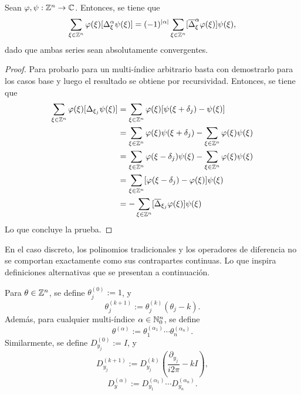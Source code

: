 \begin{proposition}
	Sean $\varphi,\psi:\mathbb{Z}^n\to\mathbb{C}$. Entonces, se tiene que 
	\begin{equation*}
		\sum_{\xi\in\mathbb{Z}^n}\varphi(\xi) [\Delta^\alpha_\xi\psi(\xi)] = (-1)^{|\alpha|}\sum_{\xi\in\mathbb{Z}^n} [\overline{\Delta}^\alpha_\xi\varphi(\xi)]\psi(\xi),
	\end{equation*}
	dado que ambas series sean absolutamente convergentes.
\end{proposition}
\begin{proof}
	Para probarlo para un multi-índice arbitrario basta con demostrarlo para los casos base y luego el resultado se obtiene por recursividad. Entonces, se tiene que 
	\begin{align*}
		\sum_{\xi\in\mathbb{Z}^n}\varphi(\xi) [\Delta_{\xi_j}\psi(\xi)] & = \sum_{\xi\in\mathbb{Z}^n}\varphi(\xi) [\psi(\xi+\delta_j) - \psi(\xi)] \\
		& = \sum_{\xi\in\mathbb{Z}^n}\varphi(\xi) \psi(\xi+\delta_j) - \sum_{\xi\in\mathbb{Z}^n}\varphi(\xi) \psi(\xi) \\
		& = \sum_{\xi\in\mathbb{Z}^n}\varphi(\xi-\delta_j) \psi(\xi) - \sum_{\xi\in\mathbb{Z}^n}\varphi(\xi) \psi(\xi) \\
		& = \sum_{\xi\in\mathbb{Z}^n}[\varphi(\xi-\delta_j) - \varphi(\xi)]\psi(\xi) \\
		& = -\sum_{\xi\in\mathbb{Z}^n} [\overline{\Delta}_{\xi_j}\varphi(\xi)]\psi(\xi)
	\end{align*}
	Lo que concluye la prueba.
\end{proof}
En el caso discreto, los polinomios tradicionales y los operadores de diferencia no se comportan exactamente como sus contrapartes continuas. Lo que inspira definiciones alternativas que se presentan a continuación.
\begin{definition}
	Para $\theta\in\mathbb{Z}^n$, se define $\theta^{(0)}_j := 1$, y
	\begin{equation*}
		\theta^{(k+1)}_j := \theta^{(k)}_j(\theta_j-k).
	\end{equation*}
	Además, para cualquier multi-índice $\alpha\in\mathbb{N}_0^n$, se define
	\begin{equation*}
		\theta^{(\alpha)} := \theta^{(\alpha_1)}_1 \cdots \theta^{(\alpha_n)}_n.
	\end{equation*}
	Similarmente, se define $D_{y_j}^{(0)} := I$, y 
	\begin{equation*}
		D_{y_j}^{(k+1)} := D_{y_j}^{(k)} \left(\frac{\partial_{y_j}}{i2\pi}-kI\right),
	\end{equation*}
	\begin{equation*}
		D^{(\alpha)}_y := D^{(\alpha_1)}_{y_1} \cdots D^{(\alpha_n)}_{y_n}.
	\end{equation*}
\end{definition}
